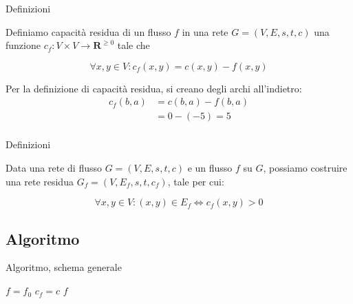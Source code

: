 \begin{frame}{Definizioni}

\vspace{-9pt}
\begin{myboxtitle}
Definiamo \alert{capacità residua} di un flusso $f$ in una rete $G=(V,E,s,t,c)$ 
una funzione $c_f: V \times V \rightarrow \mathbf{R}^{\geq 0}$
tale che 

\[
  \forall x,y \in V: c_f(x,y) = c(x,y) - f(x,y)
\]
\end{myboxtitle}

\smallskip
\begin{center}
\end{center}

Per la definizione di capacità residua, si creano degli archi all'indietro:
\begin{align*}
  c_f(b,a) &= c(b,a) - f(b,a) \\
           &= 0 - (-5)  = 5 \\
\end{align*}

\end{frame}

\begin{frame}{Definizioni}

\vspace{-9pt}
\begin{myboxtitle}
Data una rete di flusso $G=(V,E,s,t,c)$ e un flusso $f$ su $G$, 
possiamo costruire una \alert{rete residua} $G_f=(V,E_f,s,t,c_f)$, tale
per cui:

\[
  \forall x,y \in V: (x,y) \in E_f \Leftrightarrow c_f(x,y) > 0
\]
\end{myboxtitle}

\smallskip
\begin{center}
\end{center}

\end{frame}

\subsection{Algoritmo}

\begin{frame}{Algoritmo, schema generale}

\begin{Procedure}
\caption[A]{$\INTARRAY[\,]$ \Flusso(\Graph $G$, \Node $s$, \Node $t$, $\INTARRAY[\,]\ c$)}
$f = f_0$
$c_f = c$
\Return $f$
\end{Procedure}

\end{frame}

